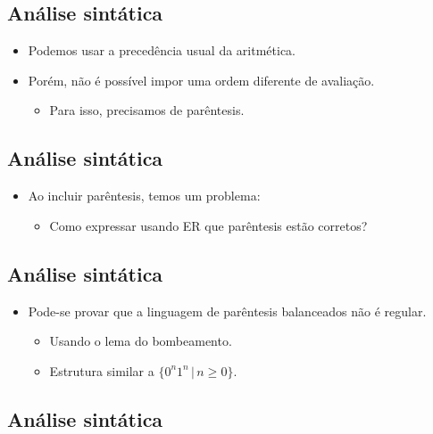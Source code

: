 \documentclass[11pt]{article}
\begin{document}
\subsection*{Análise sintática}
\label{sec:org23647d7}

\begin{itemize}
\item Podemos usar a precedência usual da aritmética.

\item Porém, não é possível impor uma ordem diferente de avaliação.
\begin{itemize}
\item Para isso, precisamos de parêntesis.
\end{itemize}
\end{itemize}

\subsection*{Análise sintática}
\label{sec:orga14d2c8}

\begin{itemize}
\item Ao incluir parêntesis, temos um problema:
\begin{itemize}
\item Como expressar usando ER que parêntesis estão corretos?
\end{itemize}
\end{itemize}

\subsection*{Análise sintática}
\label{sec:org4fba839}

\begin{itemize}
\item Pode-se provar que a linguagem de parêntesis balanceados não é regular.
\begin{itemize}
\item Usando o lema do bombeamento.
\item Estrutura similar a \(\{0^n1^n\,|\,n\geq 0\}\).
\end{itemize}
\end{itemize}

\subsection*{Análise sintática}
\label{sec:org1124837}
\end{document}
